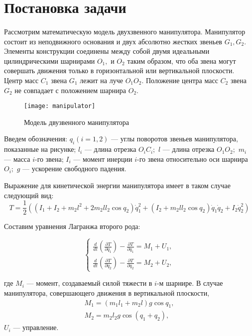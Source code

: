 \section{Постановка задачи} \label{p21}
\paragraph{}
Рассмотрим математическую модель двухзвенного манипулятора. Манипулятор состоит из неподвижного основания и двух абсолютно жестких звеньев $G_1, G_2$. Элементы конструкции соединены между собой двумя идеальными цилиндрическими шарнирами $O_1,$ и $O_2$ таким образом, что оба звена могут совершать движения только в горизонтальной или вертикальной плоскости. Центр масс $C_1$ звена $G_1$ лежит на луче $O_1 O_2.$ Положение центра масс $C_2$ звена $G_2$ не совпадает с положением шарнира $O_2$.

 \begin{figure}[h]
 	\centering
 	\texttt{[image: manipulator]}
 	\caption{Модель двузвенного манипулятора}
 	\label{fig:manip1}
 \end{figure}

Введем обозначения: $q_i (i=1, 2)$ --- углы поворотов звеньев манипулятора, показанные на рисунке; $l_i$ --- длина отрезка $O_i C_i;$ $l$ --- длина отрезка $O_1 O_2;$ $m_i$  ---  масса   $i$-го звена;   $I_i$ --- момент инерции  $i$-го звена относительно оси шарнира $O_i;$ $g$ --- ускорение свободного падения.

Выражение для кинетической энергии манипулятора имеет в таком случае следующий вид:
\begin{equation}
T = \frac12 ((I_1 + I_2 + m_2 l^2 + 2 m_2 l l_2 \cos q_2) \dot q_1^2 + (I_2 + m_2 l l_2 \cos q_2) \dot q_1 \dot q_2 + I_2 \dot q_2^2)
\end{equation}

Составим уравнения Лагранжа второго рода:

\begin{equation}
\begin{cases}
\displaystyle \frac{d}{dt} (\frac{\partial T}{\partial \dot q_1}) - \frac{\partial T}{\partial q_1} = M_1 + U_1, \\
\displaystyle \frac{d}{dt} (\frac{\partial T}{\partial \dot q_2}) - \frac{\partial T}{\partial q_2} = M_2 + U_2,
\end{cases}
\end{equation}

где $M_i$ --- момент, создаваемый силой тяжести в $i$-м шарнире. В случае манипулятора, совершающего движения в вертикальной плоскости, 
$$
\begin{array}{l}
M_1 = (m_1 l_1 + m_2 l) g \cos q_1, \\
M_2 = m_2 l_2 g \cos (q_1 + q_2),
\end{array}
$$
$U_i$ --- управление.

